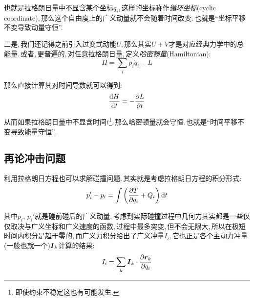 也就是拉格朗日量中不显含某个坐标$q_i$,\,这样的坐标称作\emph{循环坐标}(cyclic coordinate),\,那么这个自由度上的广义动量就不会随着时间改变.\,也就是``坐标平移不变导致动量守恒''.

二是,\,我们还记得之前引入过变式动能$U$,\,那么其实$U+V$才是对应经典力学中的总能量.\,或者,\,更普遍的,\,对任意拉格朗日量,\,定义\emph{哈密顿量}(Hamiltonian):
\[H=\sum_i p_i\dot{q}_i-L\]

那么直接计算其对时间导数就可以得到:
\[\frac{\textrm{d} H}{\textrm{d} t}=-\frac{\partial L}{\partial t}\]

从而如果拉格朗日量中不显含时间$t$\footnote{即使约束不稳定这也有可能发生.}.\,那么哈密顿量就会守恒.\,也就是``时间平移不变导致能量守恒''.


\subsection{再论冲击问题}

利用拉格朗日方程也可以求解碰撞问题.\,其实就是考虑拉格朗日方程的积分形式:
\[p_i'-p_i=\int \left(\frac{\partial T}{\partial q_i}+Q_i\right)\textrm{d} t\]

其中$p_i,\,p_i'$就是碰前碰后的广义动量,\,考虑到实际碰撞过程中几何力其实都是一些仅仅取决与广义坐标和广义速度的函数,\,过程中最多突变,\,但不会无限大,\,所以在极短时间内积分是趋于零的,\,而广义力积分给出了广义冲量$I_i$,\,它也正是各个主动力冲量(一般也就一个)$\boldsymbol{I}_k$计算的结果:
\[I_i=\sum_k \boldsymbol{I}_k\cdot \frac{\partial \boldsymbol{r}_k}{\partial q_i}\]








